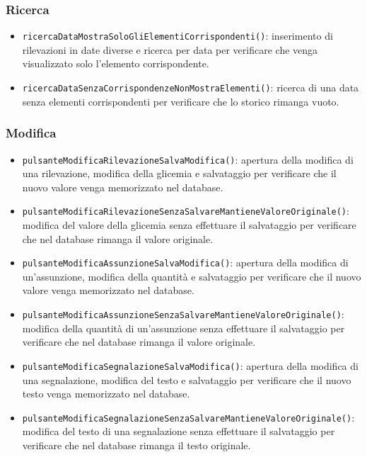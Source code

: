 \subsubsection*{Ricerca}

\begin{itemize}
	
	\item \texttt{ricercaDataMostraSoloGliElementiCorrispondenti()}: inserimento di rilevazioni in date diverse e ricerca per data per verificare che venga visualizzato solo l'elemento corrispondente.
	
	\item \texttt{ricercaDataSenzaCorrispondenzeNonMostraElementi()}: ricerca di una data senza elementi corrispondenti per verificare che lo storico rimanga vuoto.
	
\end{itemize}

\subsubsection*{Modifica}

\begin{itemize}
	
	\item \texttt{pulsanteModificaRilevazioneSalvaModifica()}: apertura della modifica di una rilevazione, modifica della glicemia e salvataggio per verificare che il nuovo valore venga memorizzato nel database.
	
	\item \texttt{pulsanteModificaRilevazioneSenzaSalvareMantieneValoreOriginale()}: modifica del valore della glicemia senza effettuare il salvataggio per verificare che nel database rimanga il valore originale.
	
	\item \texttt{pulsanteModificaAssunzioneSalvaModifica()}: apertura della modifica di un'assunzione, modifica della quantità e salvataggio per verificare che il nuovo valore venga memorizzato nel database.
	
	\item \texttt{pulsanteModificaAssunzioneSenzaSalvareMantieneValoreOriginale()}: modifica della quantità di un'assunzione senza effettuare il salvataggio per verificare che nel database rimanga il valore originale.
	
	\item \texttt{pulsanteModificaSegnalazioneSalvaModifica()}: apertura della modifica di una segnalazione, modifica del testo e salvataggio per verificare che il nuovo testo venga memorizzato nel database.
	
	\item \texttt{pulsanteModificaSegnalazioneSenzaSalvareMantieneValoreOriginale()}: modifica del testo di una segnalazione senza effettuare il salvataggio per verificare che nel database rimanga il testo originale.
	
\end{itemize}


